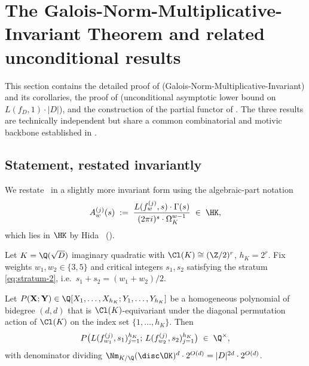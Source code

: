\section{The Galois-Norm-Multiplicative-Invariant Theorem and
 related unconditional results}\label{sec:T1-proof}

This section contains the detailed proof of 
(Galois-Norm-Multiplicative-Invariant) and its corollaries, the
proof of  (unconditional asymptotic lower bound on
$L(f_D, 1) \cdot |D|$), and the construction of the partial
functor of . The three results are technically
independent but share a common combinatorial and motivic
backbone established in .

\subsection{Statement, restated invariantly}\label{ss:T1-restate}

We restate~ in a slightly more invariant form using
the algebraic-part notation
\begin{equation}\label{eq:A-def}
A_w^{(j)}(s) \;:=\; \frac{L(f_w^{(j)}, s) \cdot \Gamma(s)}{(2\pi i)^s \cdot \Omega_K^{w-1}}
\;\in\; \HK,
\end{equation}
which lies in $\HK$ by Hida~\cite{Hida1981} ().

\begin{theorem}\label{thm:T1-restated}
Let $K = \Q(\sqrt{D})$ imaginary quadratic with $\Cl(K) \cong
(\Z/2)^r$, $h_K = 2^r$. Fix weights $w_1, w_2 \in \{3, 5\}$ and
critical integers $s_1, s_2$ satisfying the stratum
\eqref{eq:stratum-2}, i.e.\ $s_1 + s_2 = (w_1 + w_2)/2$.

Let $P(\mathbf{X}; \mathbf{Y}) \in \Q[X_1, \dots, X_{h_K};
Y_1, \dots, Y_{h_K}]$ be a homogeneous polynomial of bidegree
$(d, d)$ that is $\Cl(K)$-equivariant under the diagonal
permutation action of $\Cl(K)$ on the index set $\{1, \dots,
h_K\}$. Then
\begin{equation}\label{eq:T1-restated}
P\bigl(L(f_{w_1}^{(j)}, s_1)_{j=1}^{h_K};\,
       L(f_{w_2}^{(j)}, s_2)_{j=1}^{h_K}\bigr) \;\in\; \Q^\times,
\end{equation}
with denominator dividing $\Nm_{K/\Q}(\disc \OK)^d \cdot 2^{O(d)}
= |D|^{2d} \cdot 2^{O(d)}$.
\end{theorem}

